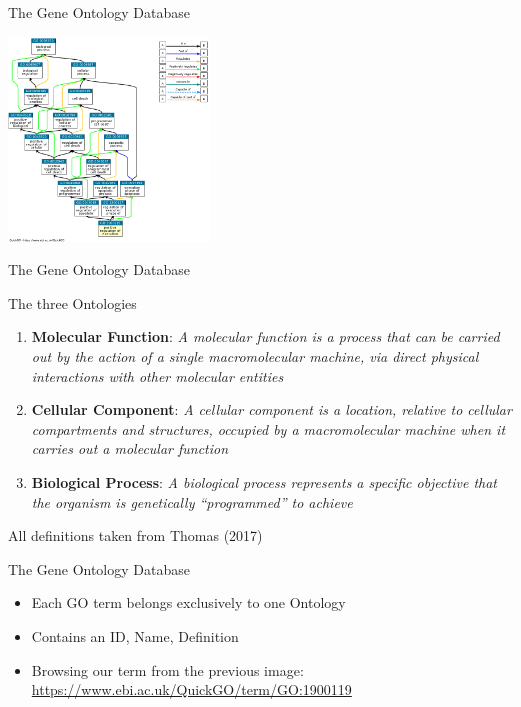 \documentclass[aspectratio=169,11pt]{beamer}
\begin{document}
\begin{frame}{The Gene Ontology Database}

	\begin{center}
	\includegraphics[width=0.4\textwidth]{figures/apoptosisDAG.png} 
	\end{center}


\end{frame}

\begin{frame}{The Gene Ontology Database}

The three Ontologies

	\begin{enumerate}
		\item \textbf{Molecular Function}: \textit{A molecular function is a process that can be carried out by the action of a single macromolecular machine, via direct physical interactions with other molecular entities}
		\pause
		\item \textbf{Cellular Component}: \textit{A cellular component is a location, relative to cellular compartments and structures, occupied by a macromolecular machine when it carries out a molecular function}
		\pause
		\item \textbf{Biological Process}: \textit{A biological process represents a specific objective that the organism is genetically “programmed” to achieve}
	\end{enumerate}
	
All definitions taken from Thomas (2017)

\end{frame}

\begin{frame}{The Gene Ontology Database}

	\begin{itemize}
		\item Each GO term belongs exclusively to one Ontology 
		\item Contains an ID, Name, Definition
		\item Browsing our term from the previous image: \url{https://www.ebi.ac.uk/QuickGO/term/GO:1900119}
	\end{itemize}

\end{frame}
\end{document}
